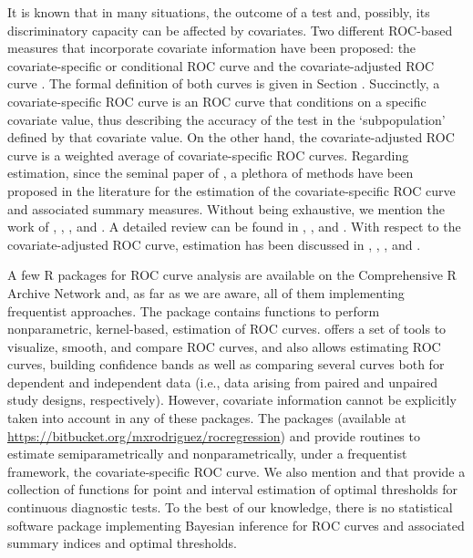 It is known that in many situations, the outcome of a test and, possibly, its discriminatory capacity can be affected by covariates. Two different ROC-based measures that incorporate covariate information have been proposed: the covariate-specific or conditional ROC curve \citep[see, e.g.,][Chapter 6]{Pepe03} and the covariate-adjusted ROC curve \citep{Janes09a}. The formal definition of both curves is given in Section . Succinctly, a covariate-specific ROC curve is an ROC curve that conditions on a specific covariate value, thus describing the accuracy of the test in the `subpopulation' defined by that covariate value. On the other hand, the covariate-adjusted ROC curve is a weighted average of covariate-specific ROC curves. Regarding estimation, since the seminal paper of \cite{Pepe98}, a plethora of methods have been proposed in the literature for the estimation of the covariate-specific ROC curve and associated summary measures. Without being exhaustive, we mention the work of \cite{Faraggi03}, \cite{MX11a,MX11b}, \cite{Inacio13}, and \cite{Inacio17}. A detailed review can be found in \cite{MX11c}, \cite{Pardo14}, and \cite{Inacio2020}. With respect to the covariate-adjusted ROC curve, estimation has been discussed in \cite{Janes09a}, \cite{MX11a}, \cite{Zhong12}, and \cite{Inacio18}. 

A few R packages for ROC curve analysis are available on the Comprehensive R Archive Network and, as far as we are aware, all of them implementing frequentist approaches. The package  \citep{package_sROC} contains functions to perform nonparametric, kernel-based, estimation of ROC curves.  \citep{package_pROC} offers a set of tools to visualize, smooth, and compare ROC curves, and  \citep{perez2018} also allows estimating ROC curves, building confidence bands as well as comparing several curves both for dependent and independent data (i.e., data arising from paired and unpaired study designs, respectively). However, covariate information cannot be explicitly taken into account in any of these packages. The packages  (available at \url{https://bitbucket.org/mxrodriguez/rocregression}) and  \citep{package_npROCRegression} provide routines to estimate semiparametrically and nonparametrically, under a frequentist framework, the covariate-specific ROC curve. We also mention   \citep{Lopez2014} and   \citep{Perez2017} that provide a collection of functions for point and interval estimation of optimal thresholds for continuous diagnostic tests. To the best of our knowledge, there is no statistical software package implementing Bayesian inference for ROC curves and associated summary indices and optimal thresholds. 

